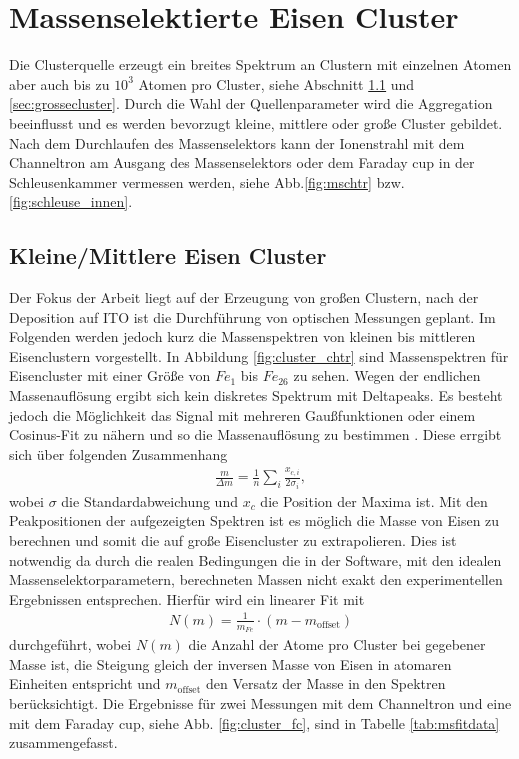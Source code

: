 \section{Massenselektierte Eisen Cluster}
Die Clusterquelle erzeugt ein breites Spektrum an Clustern mit einzelnen Atomen aber auch bis zu $10^3$ Atomen pro Cluster, siehe Abschnitt \ref{sec:kleinecluster} und \ref{sec:grossecluster}.
Durch die Wahl der Quellenparameter wird die Aggregation beeinflusst und es werden bevorzugt kleine, mittlere oder große Cluster gebildet.
Nach dem Durchlaufen des Massenselektors kann der Ionenstrahl mit dem Channeltron am Ausgang des Massenselektors oder dem Faraday cup in der Schleusenkammer vermessen werden, siehe Abb.\ref{fig:mschtr} bzw. \ref{fig:schleuse_innen}.

\subsection{Kleine/Mittlere Eisen Cluster}
\label{sec:kleinecluster}
Der Fokus der Arbeit liegt auf der Erzeugung von großen Clustern, nach der Deposition auf ITO ist die Durchführung von optischen Messungen geplant.
Im Folgenden werden jedoch kurz die Massenspektren von kleinen bis mittleren Eisenclustern vorgestellt.
In Abbildung \ref{fig:cluster_chtr} sind Massenspektren für Eisencluster mit einer Größe von $Fe_{1}$ bis $Fe_{26}$ zu sehen.
Wegen der endlichen Massenauflösung ergibt sich kein diskretes Spektrum mit Deltapeaks.
Es besteht jedoch die Möglichkeit das Signal mit mehreren Gaußfunktionen oder einem Cosinus-Fit zu nähern und so die Massenauflösung zu bestimmen \cite[S. 94 ff.]{krause}.
Diese errgibt sich über folgenden Zusammenhang
\begin{align}
  \frac{m}{\Delta m} = \frac{1}{n} \sum\limits_{i} \frac{x_{c,i}}{2 \sigma_i},
\end{align}
wobei $\sigma$ die Standardabweichung und $x_c$ die Position der Maxima ist.
Mit den Peakpositionen der aufgezeigten Spektren ist es möglich die Masse von Eisen zu berechnen und somit die auf große Eisencluster zu extrapolieren.
Dies ist notwendig da durch die realen Bedingungen die in der Software, mit den idealen Massenselektorparametern, berechneten Massen nicht exakt den experimentellen Ergebnissen entsprechen.
Hierfür wird ein linearer Fit mit
\begin{align}
  N\left(m\right) = \frac{1}{m_{Fe}} \cdot \left(m-m_{\text{offset}}\right)
\end{align}
durchgeführt, wobei $N\left(m\right)$ die Anzahl der Atome pro Cluster bei gegebener Masse ist, die Steigung gleich der inversen Masse von Eisen in atomaren Einheiten entspricht und $m_{\text{offset}}$ den Versatz der Masse in den Spektren berücksichtigt.
Die Ergebnisse für zwei Messungen mit dem Channeltron und eine mit dem Faraday cup, siehe Abb. \ref{fig:cluster_fc}, sind in Tabelle \ref{tab:msfitdata} zusammengefasst.

